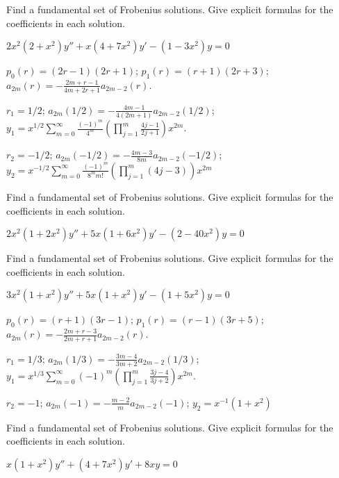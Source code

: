 \documentclass{ximera}
\begin{document}
\begin{problem}\label{exer:7.5.40} 
Find a
fundamental set of Frobenius solutions. Give explicit formulas for
the coefficients in each solution.

$2x^2(2+x^2)y''+x(4+7x^2)y'-(1-3x^2)y=0$

\begin{solution}
    $p_0(r)=(2r-1)(2r+1)$;
$p_1(r)=(r+1)(2r+3)$;
$a_{2m}(r)=-\frac{2m+r-1}{4m+2r+1}a_{2m-2}(r)$.

$r_1=1/2$;
$a_{2m}(1/2)=-\frac{4m-1}{4(2m+1)}a_{2m-2}(1/2)$;
$y_1=x^{1/2}\sum_{m=0}^\infty\frac{(-1)^m}{4^m}\left(\prod_{j=1}^m
\frac{4j-1}{2j+1}\right)x^{2m}$.

$r_2=-1/2$;
$a_{2m}(-1/2)=-\frac{4m-3}{8m}a_{2m-2}(-1/2)$;
$y_2=x^{-1/2}\sum_{m=0}^\infty\frac{(-1)^m}{8^mm!}\left(\prod_{j=1}^m
(4j-3)\right)x^{2m}$
\end{solution}
\end{problem}

\begin{problem}\label{exer:7.5.41} 
Find a
fundamental set of Frobenius solutions. Give explicit formulas for
the coefficients in each solution.

$2x^2(1+2x^2)y''+5x(1+6x^2)y'-(2-40x^2)y=0$
\end{problem}

\begin{problem}\label{exer:7.5.42} 
Find a
fundamental set of Frobenius solutions. Give explicit formulas for
the coefficients in each solution.

$3x^2(1+x^2)y''+5x(1+x^2)y'-(1+5x^2)y=0$

\begin{solution}
    $p_0(r)=(r+1)(3r-1)$;
$p_1(r)=(r-1)(3r+5)$;
$a_{2m}(r)=-\frac{2m+r-3}{2m+r+1}a_{2m-2}(r)$.

$r_1=1/3$;
$a_{2m}(1/3)=-\frac{3m-4}{3m+2}a_{2m-2}(1/3)$;
$y_1=x^{1/3}\sum_{m=0}^\infty(-1)^m\left(\prod_{j=1}^m
\frac{3j-4}{3j+2}\right)x^{2m}$.

$r_2=-1$;
$a_{2m}(-1)=-\frac{m-2}{ m}a_{2m-2}(-1)$;
 $y_2=x^{-1}(1+x^2)$
\end{solution}
\end{problem}

\begin{problem}\label{exer:7.5.43} 
Find a
fundamental set of Frobenius solutions. Give explicit formulas for
the coefficients in each solution.

$x(1+x^2)y''+(4+7x^2)y'+8xy=0$
\end{problem}
\end{document}
